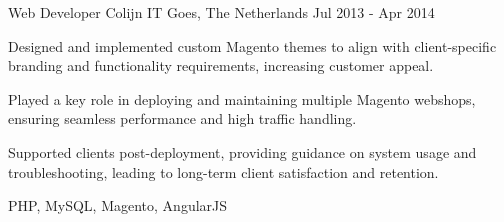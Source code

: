 \begin{cventries}
  \cventry
    {Web Developer} %
    {Colijn IT} %
    {Goes, The Netherlands} %
    {Jul 2013 - Apr 2014} %
    {
      \begin{cvitems} %
        \item {Designed and implemented custom Magento themes to align with client-specific branding and functionality requirements, increasing customer appeal.}
        \item {Played a key role in deploying and maintaining multiple Magento webshops, ensuring seamless performance and high traffic handling.  }
        \item {Supported clients post-deployment, providing guidance on system usage and troubleshooting, leading to long-term client satisfaction and retention.}
      \end{cvitems}
    }
    {PHP, MySQL, Magento, AngularJS}
\end{cventries}

